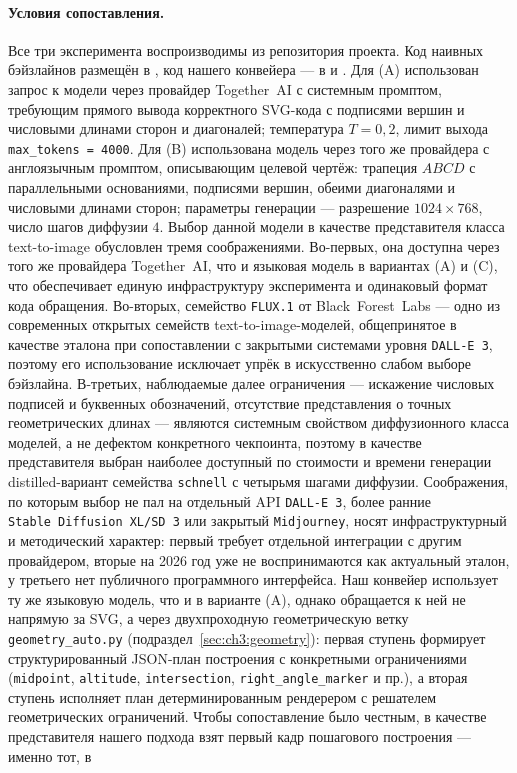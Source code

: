 \paragraph{Условия сопоставления.} Все три эксперимента воспроизводимы из репозитория проекта. Код наивных бэйзлайнов размещён в , код нашего конвейера --- в  и . Для (A) использован запрос к модели  через провайдер Together~AI с системным промптом, требующим прямого вывода корректного SVG\nobreakdash-кода с подписями вершин и числовыми длинами сторон и диагоналей; температура \(T = 0{,}2\), лимит выхода \texttt{max\_tokens = 4000}. Для (B) использована модель  через того же провайдера с англоязычным промптом, описывающим целевой чертёж: трапеция \(ABCD\) с параллельными основаниями, подписями вершин, обеими диагоналями и числовыми длинами сторон; параметры генерации --- разрешение \(1024\times 768\), число шагов диффузии \(4\). Выбор данной модели в качестве представителя класса text\nobreakdash-to\nobreakdash-image обусловлен тремя соображениями. Во\nobreakdash-первых, она доступна через того же провайдера Together~AI, что и языковая модель в вариантах (A) и (C), что обеспечивает единую инфраструктуру эксперимента и одинаковый формат кода обращения. Во\nobreakdash-вторых, семейство \texttt{FLUX.1} от Black~Forest~Labs --- одно из современных открытых семейств text\nobreakdash-to\nobreakdash-image\nobreakdash-моделей, общепринятое в качестве эталона при сопоставлении с закрытыми системами уровня \texttt{DALL\nobreakdash-E~3}, поэтому его использование исключает упрёк в искусственно слабом выборе бэйзлайна. В\nobreakdash-третьих, наблюдаемые далее ограничения --- искажение числовых подписей и буквенных обозначений, отсутствие представления о точных геометрических длинах --- являются системным свойством диффузионного класса моделей, а не дефектом конкретного чекпоинта, поэтому в качестве представителя выбран наиболее доступный по стоимости и времени генерации distilled\nobreakdash-вариант семейства \texttt{schnell} с четырьмя шагами диффузии. Соображения, по которым выбор не пал на отдельный API \texttt{DALL\nobreakdash-E~3}, более ранние \texttt{Stable~Diffusion~XL/SD~3} или закрытый \texttt{Midjourney}, носят инфраструктурный и методический характер: первый требует отдельной интеграции с другим провайдером, вторые на 2026 год уже не воспринимаются как актуальный эталон, у третьего нет публичного программного интерфейса. Наш конвейер использует ту же языковую модель, что и в варианте (A), однако обращается к ней не напрямую за SVG, а через двухпроходную геометрическую ветку \texttt{geometry\_auto.py} (подраздел~\ref{sec:ch3:geometry}): первая ступень формирует структурированный JSON\nobreakdash-план построения с конкретными ограничениями (\texttt{midpoint}, \texttt{altitude}, \texttt{intersection}, \texttt{right\_angle\_marker} и пр.), а вторая ступень исполняет план детерминированным рендерером с решателем геометрических ограничений. Чтобы сопоставление было честным, в качестве представителя нашего подхода взят первый кадр пошагового построения --- именно тот, в 